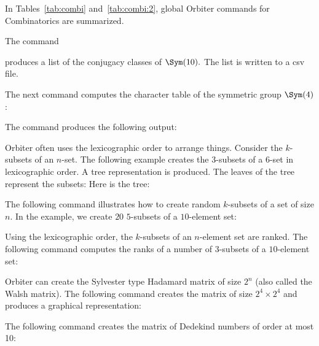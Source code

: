 In Tables~\ref{tab:combi} and~\ref{tab:combi:2},  
global Orbiter commands for Combinatorics are summarized.

\bigskip

The command 


produces a list of the conjugacy classes of $\Sym(10).$ 
The list is written to a csv file. 


\bigskip


The next command computes the character table of the symmetric group $\Sym(4)$:


The command produces the following output:

\bigskip


Orbiter often uses the lexicographic order to arrange things. 
Consider the $k$-subsets of an $n$-set. The following example creates the $3$-subsets of a $6$-set 
in lexicographic order. A tree representation is produced.  The leaves of the tree represent the subsets:
Here is the tree:


\bigskip


The following command illustrates how to create random $k$-subsets of a set of size $n$.
In the example, we create $20$ $5$-subsets of a $10$-element set:




\bigskip

Using the lexicographic order, the $k$-subsets of an $n$-element set are ranked.
The following command computes the ranks of a number of $3$-subsets of a $10$-element set:




\bigskip

Orbiter can create the Sylvester type Hadamard matrix of size $2^n$ (also called the Walsh matrix). 
The following command creates the matrix of size $2^4 \times 2^4$ and produces a graphical representation:




\bigskip

The following command creates the matrix of Dedekind numbers of order at most 10:

